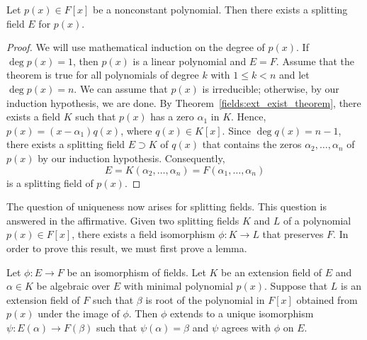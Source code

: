  
\begin{theorem}
Let $p(x) \in F[x]$ be a nonconstant polynomial. Then there exists a
splitting field $E$ for $p(x)$.
\end{theorem}
 

\begin{proof}
We will use mathematical induction on the degree of $p(x)$.  If $\deg
p(x) = 1$, then $p(x)$ is a linear polynomial and $E= F$.  Assume that
the theorem is true for all polynomials of degree $k$ with $1 \leq k <
n$ and let $\deg p(x) = n$. We can assume that $p(x)$ is irreducible;
otherwise, by our induction hypothesis, we are done. By Theorem~\ref{fields:ext_exist_theorem},
there exists a field $K$ such that $p(x)$ has a zero $\alpha_1$ in
$K$. Hence, $p(x) = (x - \alpha_1)q(x)$, where $q(x) \in K[x]$. Since
$\deg q(x) = n -1$, there exists a splitting field $E \supset K$ of
$q(x)$ that contains the zeros $\alpha_2, \ldots, \alpha_n$ of $p(x)$
by our induction hypothesis. Consequently,   
\[
E = K(\alpha_2, \ldots, \alpha_n) = F(\alpha_1, \ldots, \alpha_n)
\]
is a splitting field of $p(x)$.
\end{proof}


\medskip

The question of uniqueness now arises for splitting fields. This
question is answered in the affirmative. Given two splitting fields
$K$ and $L$ of a polynomial $p(x) \in F[x]$, there exists a field
isomorphism $\phi : K \rightarrow L$ that preserves $F$. In order to
prove this result, we must first prove a lemma. 

\medskip

\begin{lemma}\label{fields:isomorph_lemma}
Let $\phi : E \rightarrow F$ be an isomorphism of fields. Let $K$ be
an extension field of $E$ and $\alpha \in K$ be algebraic over $E$
with minimal polynomial $p(x)$. Suppose that $L$ is an extension field
of $F$ such that $\beta$ is root of the polynomial in $F[x]$ obtained
from $p(x)$ under the image of $\phi$.  Then $\phi$ extends to a unique
isomorphism $\psi : E( \alpha ) \rightarrow F( \beta )$ such that
$\psi( \alpha ) = \beta$ and $\psi$ agrees with $\phi$ on $E$.  
\end{lemma}

\medskip



